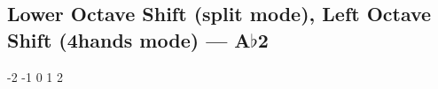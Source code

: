 \subsection{Lower Octave Shift (split mode), Left Octave Shift (4hands  mode) --- A$\flat$2}







































-2
-1
0
1
2
